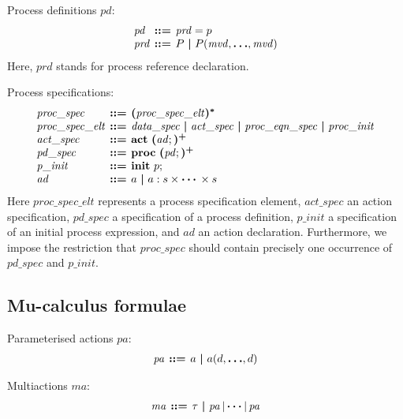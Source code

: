 \documentclass[a4paper,fleqn,10pt]{article}
\makeatletter
\newcommand{\f}[1]{\ensuremath{\mathit{#1}}}
\newenvironment{tightarray}[1]
  {\setlength{\arraycolsep}{2pt}%
   \begin{array}{@{}#1@{}}%
  }
  {\end{array}%
  }
\newcommand{\mb}[1]{\text{\boldmath$#1$}}
\newcommand{\kwact}{{\bf act}}
\newcommand{\kwproc}{{\bf proc}}
\newcommand{\kwinit}{{\bf init}}
\makeatother
\begin{document}
Process definitions $\f{pd}$:
\[\begin{tightarray}{lrl}
\f{pd}  & \mb{::=} & \f{prd} = p\\
\f{prd} & \mb{::=} & P\ \mb{|}\ P(\f{mvd},\mb{\ldots},\f{mvd})
\end{tightarray}\]
Here, $\f{prd}$ stands for process reference declaration.

Process specifications:
\[\begin{tightarray}{lrl}
\f{proc\_spec}      & \mb{::=} & \mb{(}\f{proc\_spec\_elt}\mb{)^{*}}\\
\f{proc\_spec\_elt} & \mb{::=} & \f{data\_spec}\ \mb{|}\ \f{act\_spec}\ \mb{|}\ \f{proc\_eqn\_spec}\ \mb{|}\ \f{proc\_init}\\
\f{act\_spec}       & \mb{::=} & \kwact\ \mb{(}\f{ad};\mb{)^{+}}\\
\f{pd\_spec}        & \mb{::=} & \kwproc\ \mb{(}\f{pd};\mb{)^{+}}\\
\f{p\_init}         & \mb{::=} & \kwinit\ p;\\
\f{ad}              & \mb{::=} & a\ \mb{|}\ a: s \times \mb{\cdots} \times s
\end{tightarray}\]
Here $\f{proc\_spec\_elt}$ represents a process specification element, $\f{act\_spec}$ an action specification, $\f{pd\_spec}$ a specification of a process definition, $\f{p\_init}$ a specification of an initial process expression, and $\f{ad}$ an action declaration. Furthermore, we impose the restriction that $\f{proc\_spec}$ should contain precisely one occurrence of $\f{pd\_spec}$ and $\f{p\_init}$.


\subsection{Mu-calculus formulae}

Parameterised actions $\f{pa}$:
\[\begin{tightarray}{lrl}
\f{pa} & \mb{::=} & a\ \mb{|}\ a(d,\mb{\ldots},d)
\end{tightarray}\]

\noindent
Multiactions $\f{ma}$:
\[\begin{tightarray}{lrl}
\f{ma} & \mb{::=} & \tau\ \mb{|}\ \f{pa}\,|\,\mb{\cdots} |\,\f{pa}\\
\end{tightarray}\]
\end{document}

